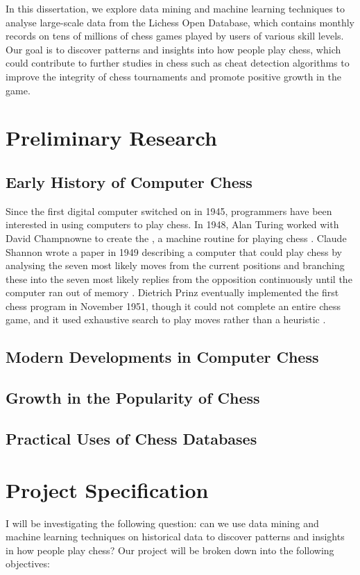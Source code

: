 \documentclass[a4paper, 11pt]{article}
\begin{document}
In this dissertation, we explore data mining and machine learning techniques to analyse large-scale data from the Lichess Open Database, which contains monthly records on tens of millions of chess games played by users of various skill levels. Our goal is to discover patterns and insights into how people play chess, which could contribute to further studies in chess such as cheat detection algorithms to improve the integrity of chess tournaments and promote positive growth in the game.

\section{Preliminary Research}

\subsection{Early History of Computer Chess}
Since the first digital computer switched on in 1945, programmers have been interested in using computers to play chess. In 1948, Alan Turing worked with David Champnowne to create the , a machine routine for playing chess \cite{copeland2005turing}. Claude Shannon wrote a paper in 1949 describing a computer that could play chess by analysing the seven most likely moves from the current positions and branching these into the seven most likely replies from the opposition continuously until the computer ran out of memory \cite{shannon1950xxii}. Dietrich Prinz eventually implemented the first chess program in November 1951, though it could not complete an entire chess game, and it used exhaustive search to play moves rather than a heuristic \cite{copeland2005turing}.

\subsection{Modern Developments in Computer Chess}

\subsection{Growth in the Popularity of Chess}

\subsection{Practical Uses of Chess Databases}

\section{Project Specification}
I will be investigating the following question: can we use data mining and machine learning techniques on historical data to discover patterns and insights in how people play chess? Our project will be broken down into the following objectives:
\end{document}
